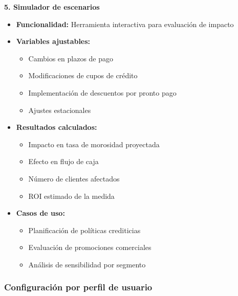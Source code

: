 \textbf{5. Simulador de escenarios}
\begin{itemize}
    \item \textbf{Funcionalidad:} Herramienta interactiva para evaluación de impacto
    \item \textbf{Variables ajustables:}
    \begin{itemize}
        \item Cambios en plazos de pago
        \item Modificaciones de cupos de crédito
        \item Implementación de descuentos por pronto pago
        \item Ajustes estacionales
    \end{itemize}
    \item \textbf{Resultados calculados:}
    \begin{itemize}
        \item Impacto en tasa de morosidad proyectada
        \item Efecto en flujo de caja
        \item Número de clientes afectados
        \item ROI estimado de la medida
    \end{itemize}
    \item \textbf{Casos de uso:}
    \begin{itemize}
        \item Planificación de políticas crediticias
        \item Evaluación de promociones comerciales
        \item Análisis de sensibilidad por segmento
    \end{itemize}
\end{itemize}

\subsubsection{Configuración por perfil de usuario}

